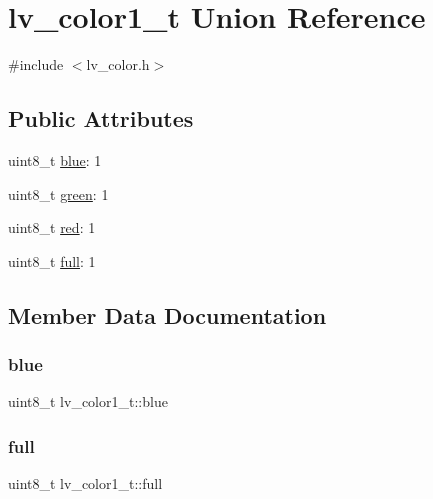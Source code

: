 \hypertarget{unionlv__color1__t}{}\section{lv\+\_\+color1\+\_\+t Union Reference}
\label{unionlv__color1__t}


{\ttfamily \#include $<$lv\+\_\+color.\+h$>$}

\subsection*{Public Attributes}
\begin{DoxyCompactItemize}
\item 
uint8\+\_\+t \mbox{\hyperlink{unionlv__color1__t_aab1e82f0cd269b6831d6245aad779664}{blue}}\+: 1
\item 
uint8\+\_\+t \mbox{\hyperlink{unionlv__color1__t_a842588a68947b7c67e7e568740982c36}{green}}\+: 1
\item 
uint8\+\_\+t \mbox{\hyperlink{unionlv__color1__t_a43b5e095f8632b825693462b85b22132}{red}}\+: 1
\item 
uint8\+\_\+t \mbox{\hyperlink{unionlv__color1__t_ab0765bc623f863cc7d1cb39381fc3509}{full}}\+: 1
\end{DoxyCompactItemize}


\subsection{Member Data Documentation}
\mbox{\label{unionlv__color1__t_aab1e82f0cd269b6831d6245aad779664}} 
\subsubsection{\texorpdfstring{blue}{blue}}
{\footnotesize\ttfamily uint8\+\_\+t lv\+\_\+color1\+\_\+t\+::blue}

\mbox{\label{unionlv__color1__t_ab0765bc623f863cc7d1cb39381fc3509}} 
\subsubsection{\texorpdfstring{full}{full}}
{\footnotesize\ttfamily uint8\+\_\+t lv\+\_\+color1\+\_\+t\+::full}

